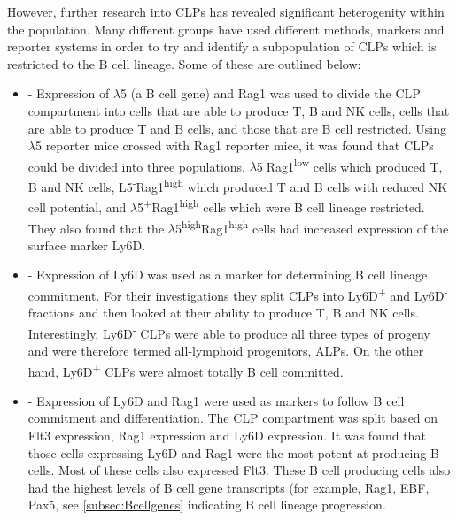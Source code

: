 

However, further research into CLPs has revealed significant heterogenity within the population.
Many different groups have used different methods, markers and reporter systems in order to try and identify a subpopulation of CLPs which is restricted to the B cell lineage. 
Some of these are outlined below:
\begin{itemize}
\item \citet{Mansson2010} - Expression of $\lambda$5 (a B cell gene) and Rag1 was used to divide the CLP compartment into cells that are able to produce T, B and NK cells, cells that are able to produce T and B cells, and those that are B cell restricted.
Using $\lambda$5 reporter mice crossed with Rag1 reporter mice, it was found that CLPs could be divided into three populations.
$\lambda$5\textsuperscript{-}Rag1\textsuperscript{low} cells which produced T, B and NK cells, L5\textsuperscript{-}Rag1\textsuperscript{high} which produced T and B cells with reduced NK cell potential, and $\lambda$5\textsuperscript{+}Rag1\textsuperscript{high} cells which were B cell lineage restricted.
They also found that the $\lambda$5\textsuperscript{high}Rag1\textsuperscript{high} cells had increased expression of the surface marker Ly6D.
\item \citet{Inlay2009} - Expression of Ly6D was used as a marker for determining B cell lineage commitment.
For their investigations they split CLPs into Ly6D\textsuperscript{+} and Ly6D\textsuperscript{-} fractions and then looked at their ability to produce T, B and NK cells.
Interestingly, Ly6D\textsuperscript{-} CLPs were able to produce all three types of progeny and were therefore termed all-lymphoid progenitors, ALPs.
On the other hand, Ly6D\textsuperscript{+} CLPs were almost totally B cell committed.
\item \citet{Zhang2013} - Expression of Ly6D and Rag1 were used as markers to follow B cell commitment and differentiation.
The CLP compartment was split based on Flt3 expression, Rag1 expression and Ly6D expression.
It was found that those cells expressing Ly6D and Rag1 were the most potent at producing B cells. 
Most of these cells also expressed Flt3.
These B cell producing cells also had the highest levels of B cell gene transcripts (for example, Rag1, EBF, Pax5, see \cref{subsec:Bcellgenes} indicating B cell lineage progression.
\end{itemize}

